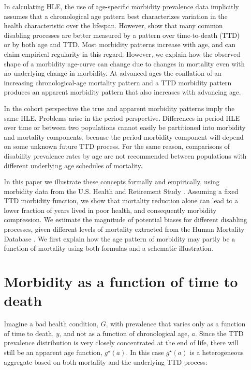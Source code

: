 \documentclass[11pt,oneside,a4paper]{article} %
\begin{document}
In calculating HLE, the use of age-specific morbidity prevalence data implicitly
assumes that a chronological age pattern best characterizes variation in the
health characteristic over the lifespan.
However, \citet{riffe2015ttd} show that many common disabling
processes are better measured by a pattern over time-to-death (TTD) or by both age and TTD. Most morbidity
patterns increase with age, and can claim empirical regularity in this regard.
However, we explain how the observed shape of a morbidity age-curve can change
due to changes in mortality even with no underlying change in morbidity. At advanced ages the conflation of an increasing chronological-age
mortality pattern and a TTD morbidity pattern produces an apparent morbidity pattern that also increases with advancing age. 

In the
cohort perspective the true and apparent morbidity patterns imply the same HLE.
Problems arise in the period perspective. Differences in period HLE over
time or between two populations cannot easily be partitioned into morbidity and
mortality components, because the period morbidity component will depend on some unknown future TTD process. For the same reason, comparisons of disability prevalence rates by age are not recommended between populations with different underlying age schedules of mortality.

In this paper we illustrate these concepts formally and empirically, using morbidity data from the U.S. Health and Retirement Study \citep{RAND, HRS}. Assuming a fixed TTD morbidity function, we show that mortality reduction alone can lead to a lower fraction of years lived in poor health, and consequently morbidity compression. We estimate the magnitude of potential biases for different disabling processes, given different levels of mortality extracted from the Human Mortality Database \citep{HMD2015}. We first explain how the age pattern of morbidity may partly be a function of mortality using both formulas and a schematic illustration.


\section{Morbidity as a function of time to death}
 \label{sec:morb}
Imagine a bad health condition, $G$, with prevalence that varies only as a
function of time to death, $y$, and not as a function of chronological age, $a$.
Since the TTD prevalence distribution is very closely concentrated at the end of life, there will still be an apparent age function,
$g^\star(a)$.
In this case $g^\star(a)$ is a heterogeneous aggregate based on both mortality
and the underlying TTD process:
 
\end{document}
